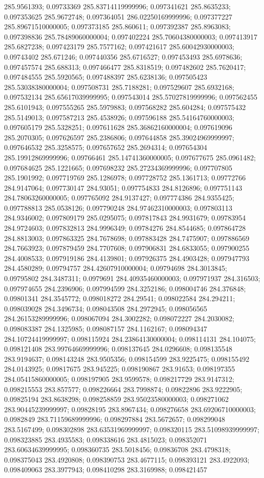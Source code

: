285.9561393; 0.09733369 285.83714119999996; 0.097341621 285.8635233; 0.097353625 285.9672748; 0.097364051 286.02250169999996; 0.097377227 285.89671510000005; 0.097373185 285.860611; 0.097392387 285.8963083; 0.097398836 285.78489060000004; 0.097402224 285.70604380000003; 0.097413917 285.6827238; 0.097423179 285.7577162; 0.097421617 285.60042930000003; 0.09743402 285.671246; 0.097440356 285.6716527; 0.097453493 285.6978636; 0.097457574 285.688313; 0.097466477 285.8318519; 0.097482602 285.7620417; 0.097484555 285.5920565; 0.097488397 285.6238136; 0.097505423 285.53038380000004; 0.097508731 285.7188281; 0.097529607 285.6932168; 0.097532134 285.65617039999995; 0.097543014 285.57027819999996; 0.097562455 285.6101943; 0.097555265 285.5979883; 0.097568282 285.604284; 0.097575432 285.5149013; 0.097587213 285.4538926; 0.097596188 285.54164760000003; 0.097605179 285.5328251; 0.097611628 285.36862160000004; 0.097619096 285.2070305; 0.097626597 285.2386806; 0.097644858 285.39024969999997; 0.097646532 285.3258575; 0.097657652 285.2694314; 0.097654304 285.19912869999996; 0.09766461 285.14741360000005; 0.097677675 285.0961482; 0.097684625 285.1221665; 0.097698232 285.27234369999996; 0.097707805 285.1901992; 0.097719769 285.1286978; 0.097728752 285.1361713; 0.09772766 284.9147064; 0.097730147 284.93051; 0.097754833 284.8126896; 0.097751143 284.78063260000005; 0.097765092 284.9137427; 0.097774386 284.9355425; 0.097788813 285.0538126; 0.097790248 284.97462310000003; 0.097803113 284.9346002; 0.097809179 285.0295075; 0.097817843 284.9931679; 0.09783954 284.9724603; 0.097832813 284.9996349; 0.09784276 284.8544685; 0.097864728 284.8813003; 0.097863325 284.7678698; 0.097883428 284.7475907; 0.097886569 284.7663923; 0.097879459 284.7707608; 0.097906831 284.6833055; 0.097900255 284.4008533; 0.097919186 284.4139801; 0.097926375 284.4903428; 0.097947793 284.4580289; 0.09794757 284.42607910000004; 0.09794698 284.3013845; 0.09795802 284.3487311; 0.0979691 284.40935460000003; 0.097971937 284.316503; 0.097974655 284.2396906; 0.097994599 284.3252186; 0.098004746 284.376848; 0.09801341 284.3545772; 0.098018272 284.29541; 0.098022584 284.294211; 0.098039028 284.3496734; 0.098043508 284.2972945; 0.098056565 284.26153289999996; 0.098067094 284.3002282; 0.098072227 284.2030082; 0.098083387 284.1325985; 0.098087157 284.1162167; 0.098094347 284.10724419999997; 0.098115924 284.23864130000004; 0.098114131 284.104075; 0.098121408 283.99764669999996; 0.098137645 284.0296608; 0.098135548 283.9194637; 0.098143248 283.9505356; 0.098154599 283.9225475; 0.098155492 284.0143925; 0.09817675 283.945225; 0.098190867 283.91653; 0.098197355 284.05415860000005; 0.098197905 283.9599578; 0.098217729 283.9147312; 0.098215553 283.857577; 0.098226664 283.7998874; 0.09822896 283.9222905; 0.09825194 283.8638298; 0.098258859 283.95023580000003; 0.098271062 283.90445239999997; 0.09828195 283.8967434; 0.098276658 283.69206710000003; 0.0982849 283.71159689999996; 0.098297884 283.5672657; 0.098299048 283.5167499; 0.098302898 283.63531969999997; 0.098320115 283.51098939999997; 0.098323885 283.4935583; 0.098338616 283.4815023; 0.098352071 283.60634639999995; 0.098360735 283.5018456; 0.09836708 283.4798318; 0.098375043 283.4920808; 0.098390753 283.4677115; 0.098393121 283.4922093; 0.098409063 283.3977943; 0.098410298 283.3169988; 0.098421457 
